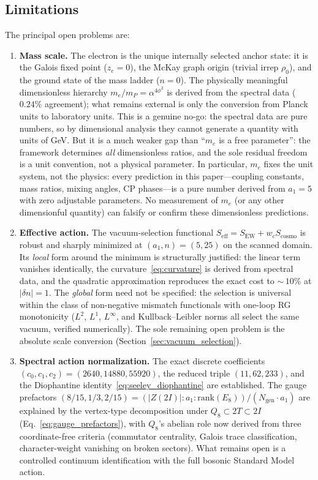 \documentclass[12pt,a4paper]{article}
\theoremstyle{definition}
\begin{document}
\subsection{Limitations}
\label{sec:limitations}

The principal open problems are:
\begin{enumerate}
\item \textbf{Mass scale.}  The electron is the unique internally selected anchor state: it is the Galois fixed point ($z_e = 0$), the McKay graph origin (trivial irrep $\rho_0$), and the ground state of the mass ladder ($n = 0$).  The physically meaningful dimensionless hierarchy $m_e/m_P = \alpha^{4\phi^2}$ is derived from the spectral data ($0.24\%$ agreement); what remains external is only the conversion from Planck units to laboratory units.  This is a genuine no-go: the spectral data are pure numbers, so by dimensional analysis they cannot generate a quantity with units of GeV.  But it is a much weaker gap than ``$m_e$ is a free parameter'': the framework determines \emph{all} dimensionless ratios, and the sole residual freedom is a unit convention, not a physical parameter.  In particular, $m_e$ fixes the unit system, not the physics: every prediction in this paper---coupling constants, mass ratios, mixing angles, CP phases---is a pure number derived from $a_1 = 5$ with zero adjustable parameters.  No measurement of $m_e$ (or any other dimensionful quantity) can falsify or confirm these dimensionless predictions.
\item \textbf{Effective action.} The vacuum-selection functional $S_{\mathrm{eff}} = S_{\mathrm{EW}} + w_c S_{\mathrm{cosmo}}$ is robust and sharply minimized at $(a_1,n) = (5,25)$ on the scanned domain.  Its \emph{local} form around the minimum is structurally justified: the linear term vanishes identically, the curvature~\eqref{eq:curvature} is derived from spectral data, and the quadratic approximation reproduces the exact cost to ${\sim}\,10\%$ at $|\delta n| = 1$.  The \emph{global} form need not be specified: the selection is universal within the class of non-negative mismatch functionals with one-loop RG monotonicity ($L^2$, $L^1$, $L^\infty$, and Kullback--Leibler norms all select the same vacuum, verified numerically).  The sole remaining open problem is the absolute scale conversion (Section~\ref{sec:vacuum_selection}).
\item \textbf{Spectral action normalization.} The exact discrete coefficients $(c_0,c_1,c_2) = (2640,14880,55920)$, the reduced triple $(11,62,233)$, and the Diophantine identity~\eqref{eq:seeley_diophantine} are established.  The gauge prefactors $(8/15,1/3,2/15) = (|Z(2I)| : a_1 : \mathrm{rank}(E_8))/(N_{\text{gen}} \cdot a_1)$ are explained by the vertex-type decomposition under $Q_8 \subset 2T \subset 2I$ (Eq.~\ref{eq:gauge_prefactors}), with $Q_8$'s abelian role now derived from three coordinate-free criteria (commutator centrality, Galois trace classification, character-weight vanishing on broken sectors).  What remains open is a controlled continuum identification with the full bosonic Standard Model action.

\end{enumerate}
\end{document}
